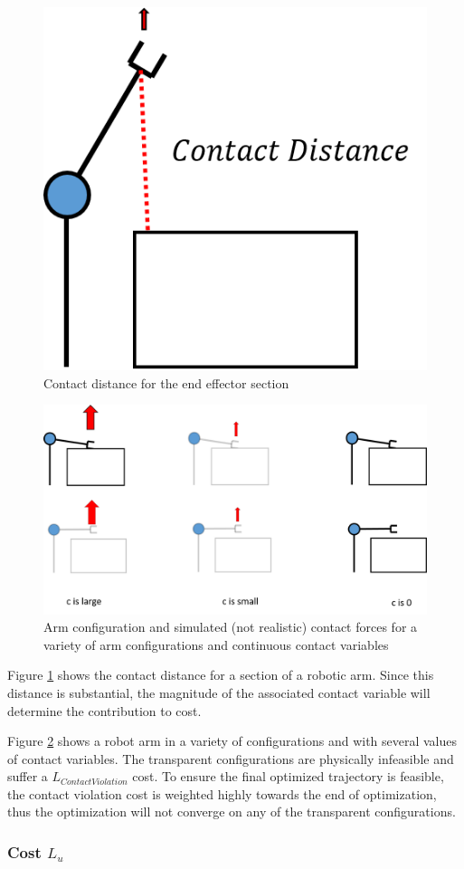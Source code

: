 \documentclass[../thesis.tex]{subfiles}
\begin{document}
\begin{figure}
  \centering
  \includegraphics[width=.3\linewidth]{./Planning/contact_distance.png}
  \caption{Contact distance for the end effector section}
  \label{fig:contact_distance}
\end{figure}


\begin{figure}
  \centering
  \includegraphics[width=.7\linewidth]{./Planning/ContactArms.png}
  \caption{Arm configuration and simulated (not realistic) contact forces for a variety of arm configurations and continuous contact variables}
  \label{fig:ContactArms}
\end{figure}

Figure \ref{fig:contact_distance} shows the contact distance for a section of a robotic arm. Since this distance is substantial, the magnitude of the associated contact variable will determine the contribution to cost. 

Figure \ref{fig:ContactArms} shows a robot arm in a variety of configurations and with several values of contact variables.
The transparent configurations are physically infeasible and suffer a $L_{Contact Violation}$ cost.
To ensure the final optimized trajectory is feasible, the contact violation cost is weighted highly towards the end of optimization, thus the optimization will not converge on any of the transparent configurations.




\subsubsection{Cost $L_u$}
\end{document}

